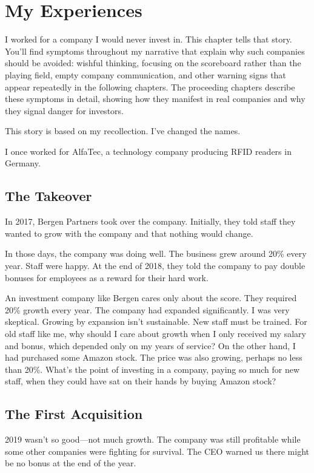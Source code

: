 \chapter{My Experiences}

I worked for a company I would never invest in. This chapter tells that story. You'll find symptoms throughout my narrative that explain why such companies should be avoided: wishful thinking, focusing on the scoreboard rather than the playing field, empty company communication, and other warning signs that appear repeatedly in the following chapters. The proceeding chapters describe these symptoms in detail, showing how they manifest in real companies and why they signal danger for investors.

This story is based on my recollection. I've changed the names.

I once worked for AlfaTec, a technology company producing RFID readers in Germany.

\section{The Takeover}

In 2017, Bergen Partners took over the company. Initially, they told staff they wanted to grow with the company and that nothing would change.

In those days, the company was doing well. The business grew around 20\% every year. Staff were happy. At the end of 2018, they told the company to pay double bonuses for employees as a reward for their hard work.

An investment company like Bergen cares only about the score. They required 20\% growth every year. The company had expanded significantly. I was very skeptical. Growing by expansion isn't sustainable. New staff must be trained. For old staff like me, why should I care about growth when I only received my salary and bonus, which depended only on my years of service? On the other hand, I had purchased some Amazon stock. The price was also growing, perhaps no less than 20\%. What's the point of investing in a company, paying so much for new staff, when they could have sat on their hands by buying Amazon stock?

\section{The First Acquisition}

2019 wasn't so good—not much growth. The company was still profitable while some other companies were fighting for survival. The CEO warned us there might be no bonus at the end of the year.

